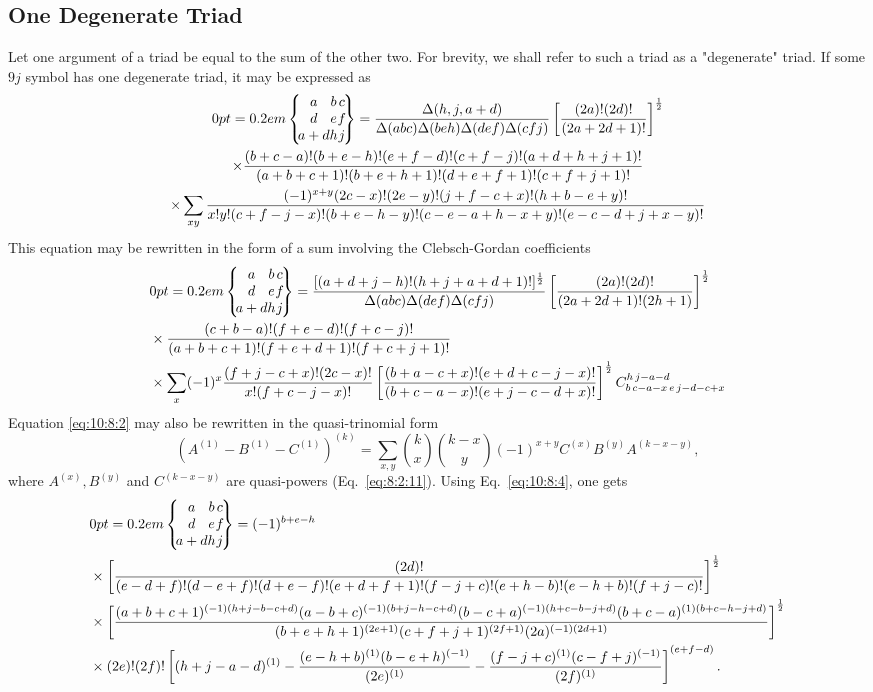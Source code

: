 \subsection{One Degenerate Triad}\label{sec:10.8.2}
Let one argument of a triad be equal to the sum of the other two. For brevity, we shall refer to such a triad as a "degenerate" triad. If some $9 j$ symbol has one degenerate triad, it may be expressed as
\begin{gather}
\ninej{a}{b}{c}{d}{e}{f}{a+d}{h}{j}=\frac{\Delta(h, j, a+d)}{\Delta(a b c) \Delta(b e h) \Delta(d e f) \Delta(c f j)}\left[\frac{(2 a)!(2 d)!}{(2 a+2 d+1)!}\right]^{\frac{1}{2}}  \notag\\
\times \frac{(b+c-a)!(b+e-h)!(e+f-d)!(c+f-j)!(a+d+h+j+1)!}{(a+b+c+1)!(b+e+h+1)!(d+e+f+1)!(c+f+j+1)!}  \notag\\
\times \sum_{x y} \frac{(-1)^{x+y}(2 c-x)!(2 e-y)!(j+f-c+x)!(h+b-e+y)!}{x!y!(c+f-j-x)!(b+e-h-y)!(c-e-a+h-x+y)!(e-c-d+j+x-y)!} \label{eq:10:8:2}
\end{gather}
This equation may be rewritten in the form of a sum involving the Clebsch-Gordan coefficients \cite{ref104}
\begin{align}
&\ninej{a}{b}{c}{d}{e}{f}{a+d}{h}{j}= \frac{[(a+d+j-h)!(h+j+a+d+1)!]^{\frac{1}{2}}}{\Delta(a b c) \Delta(d e f) \Delta(c f j)}\left[\frac{(2 a)!(2 d)!}{(2 a+2 d+1)!(2 h+1)}\right]^{\frac{1}{2}}  \notag\\
& \times \frac{(c+b-a)!(f+e-d)!(f+c-j)!}{(a+b+c+1)!(f+e+d+1)!(f+c+j+1)!}  \notag\\
& \times \sum_{x}(-1)^{x} \frac{(f+j-c+x)!(2 c-x)!}{x!(f+c-j-x)!}\left[\frac{(b+a-c+x)!(e+d+c-j-x)!}{(b+c-a-x)!(e+j-c-d+x)!}\right]^{\frac{1}{2}} \clebsch{b}{c-a-x}{e}{j-d-c+x}{h}{j-a-d} \label{eq:10:8:3}
\end{align}
Equation \eqref{eq:10:8:2} may also be rewritten in the quasi-trinomial form
\begin{equation}
\left(A^{(1)}-B^{(1)}-C^{(1)}\right)^{(k)}=\sum_{x, y}\binom{k}{x}\binom{k-x}{y}(-1)^{x+y} C^{(x)} B^{(y)} A^{(k-x-y)}, \label{eq:10:8:4}
\end{equation}
where $A^{(x)}, B^{(y)}$ and $C^{(k-x-y)}$ are quasi-powers (Eq.~\eqref{eq:8:2:11}). Using Eq.~\eqref{eq:10:8:4}, one gets \cite{ref045}
\begin{align}
& \ninej{a}{b}{c}{d}{e}{f}{a+d}{h}{j}=(-1)^{b+e-h}\nonumber\\
& \times
\left[\frac{(2d)!}{(e-d+f)!(d-e+f)!(d+e-f)!(e+d+f+1)!(f-j+c)!(e+h-b)!(e-h+b)!(f+j-c)!}\right]^\frac12 \notag\\
&\times\left[\frac{(a+b+c+1)^{(-1)(h+j-b-c+d)}(a-b+c)^{(-1)(b+j-h-c+d)}(b-c+a)^{(-1)(h+c-b-j+d)}(b+c-a)^{(1)(b+c-h-j+d)} }{(b+e+h+1)^{(2 e+1)} (c+f+j+1)^{(2 f+1)}(2 a)^{(-1)(2 d+1)}}\right]^{\frac{1}{2}}  \notag\\
& \times(2 e)!(2 f)!\left[(h+j-a-d)^{(1)}-\frac{(e-h+b)^{(1)}(b-e+h)^{(-1)}}{(2 e)^{(1)}}-\frac{(f-j+c)^{(1)}(c-f+j)^{(-1)}}{(2 f)^{(1)}}\right]^{(e+f-d)} . \label{eq:10:8:5}
\end{align}
